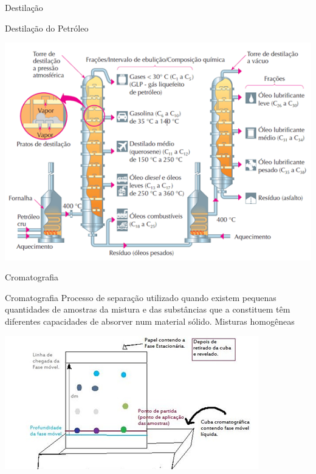 \documentclass{beamer}
\begin{document}
\begin{frame}[label={sec:orge5cbe24}]{Destilação}
\begin{block}{Destilação do Petróleo}
\begin{center}
\includegraphics[scale=0.4]{../img/petroleo2.png}
\end{center}
\end{block}
\end{frame}
\begin{frame}[label={sec:orgd0183e3}]{Cromatografia}
\begin{block}{Cromatografia}
Processo de separação utilizado quando existem pequenas quantidades de amostras da mistura e das substâncias que a constituem têm diferentes capacidades de absorver num material sólido. \alert{Misturas homogêneas}

\begin{center}
\includegraphics[width=.9\linewidth]{../img/cromatografia2.png}
\end{center}
\end{block}
\end{frame}
\end{document}
